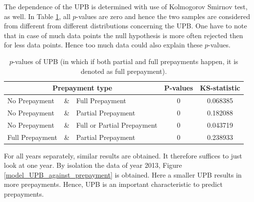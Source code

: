         \noindent
        The dependence of the UPB is determined with use of 
        Kolmogorov Smirnov test, as well. In Table 
        \ref{model_Pvals_of_UPB}, all $p$-values are zero and hence 
        the two samples are considered from different from different 
        distributions concerning the UPB. One have to note that in case of much data points 
        the null hypothesis is more often rejected then for less data points. 
        Hence too much data could also explain these $p$-values. 
        \begin{table}[H]
        \centering
            \begin{tabular}{lcl|c|c}
                \multicolumn{3}{c|}{Prepayment type} 
                & P-values& KS-statistic \\\hline
                No Prepayment & \& & Full Prepayment & 0 & 0.068385\\
                No Prepayment & \& & Partial Prepayment & 0 & 0.182088\\
                No Prepayment & \& & Full or Partial Prepayment & 0 & 0.043719 \\
                Full Prepayment & \& & Partial Prepayment & 0 & 0.238933
		    \end{tabular}
            \caption{
                $p$-values of UPB (in which if both partial and full 
                prepayments happen, it is denoted as full prepayment).
                }
	        \label{model_Pvals_of_UPB}
        \end{table}
        For all years separately, similar results are obtained.
        It therefore suffices to just look at one year.  
        By isolation the data of year 2013, Figure 
        \ref{model_UPB_against_prepayment} is obtained. Here a smaller 
        UPB results in more prepayments. Hence, UPB is an 
        important characteristic to predict prepayments. 
